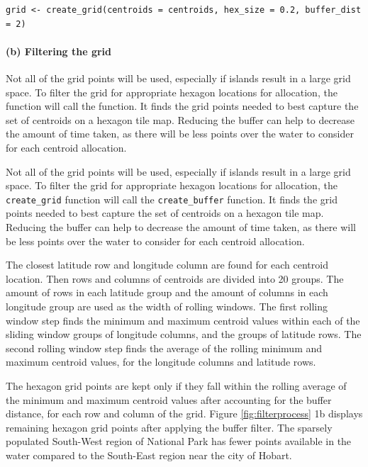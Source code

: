 \begin{verbatim}
grid <- create_grid(centroids = centroids, hex_size = 0.2, buffer_dist = 2)
\end{verbatim}

\hypertarget{b-filtering-the-grid}{%
\paragraph{(b) Filtering the grid}\label{b-filtering-the-grid}}

Not all of the grid points will be used, especially if islands result in a large grid space. To filter the grid for appropriate hexagon locations for allocation, the  function will call the  function. It finds the grid points needed to best capture the set of centroids on a hexagon tile map. Reducing the buffer can help to decrease the amount of time taken, as there will be less points over the water to consider for each centroid allocation.

Not all of the grid points will be used, especially if islands result in a large grid space. To filter the grid for appropriate hexagon locations for allocation, the \texttt{create\_grid} function will call the \texttt{create\_buffer} function. It finds the grid points needed to best capture the set of centroids on a hexagon tile map. Reducing the buffer can help to decrease the amount of time taken, as there will be less points over the water to consider for each centroid allocation.

The closest latitude row and longitude column are found for each centroid location. Then rows and columns of centroids are divided into 20 groups. The amount of rows in each latitude group and the amount of columns in each longitude group are used as the width of rolling windows. The first rolling window step finds the minimum and maximum centroid values within each of the sliding window groups of longitude columns, and the groups of latitude rows. The second rolling window step finds the average of the rolling minimum and maximum centroid values, for the longitude columns and latitude rows.

The hexagon grid points are kept only if they fall within the rolling average of the minimum and maximum centroid values after accounting for the buffer distance, for each row and column of the grid. Figure \ref{fig:filterprocess} 1b displays remaining hexagon grid points after applying the buffer filter. The sparsely populated South-West region of National Park has fewer points available in the water compared to the South-East region near the city of Hobart.

